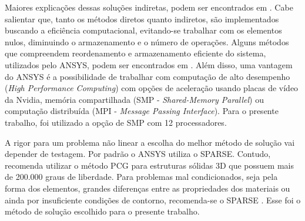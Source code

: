 Maiores explicações dessas soluções indiretas, podem ser encontrados em . Cabe salientar que, tanto os métodos diretos quanto indiretos, são implementados buscando a eficiência computacional, evitando-se trabalhar com os elementos nulos, diminuindo o armazenamento e o número de operações. Alguns métodos que compreendem reordenamento e armazenamento eficiente do sistema, utilizados pelo ANSYS, podem ser encontrados em . Além disso, uma vantagem do ANSYS é a possibilidade de trabalhar com computação de alto desempenho (\textit{High Performance Computing}) com opções de aceleração usando placas de vídeo da Nvidia, memória compartilhada (SMP - \textit{Shared-Memory Parallel}) ou computação distribuída (MPI - \textit{Message Passing Interface}). Para o presente trabalho, foi utilizado a opção de SMP com 12 processadores.

A rigor para um problema não linear a escolha do melhor método de solução vai depender de testagem. Por padrão o ANSYS utiliza o SPARSE. Contudo, recomenda utilizar o método PCG para estruturas sólidas 3D que possuem mais de 200.000 graus de liberdade. Para problemas mal condicionados, seja pela forma dos elementos, grandes diferenças entre as propriedades dos materiais ou ainda por insuficiente condições de contorno, recomenda-se o SPARSE \cite[p. 242]{ANSYS2018b}. Esse foi o método de solução escolhido para o presente trabalho.

